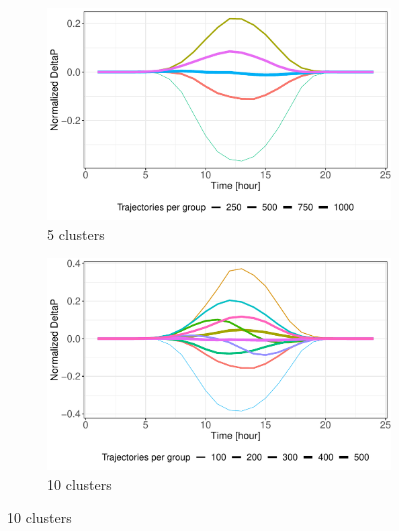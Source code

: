 \documentclass[12pt]{report}
\begin{document}
\begin{figure}[htbp] 
	\begin{subfigure}[b]{0.5\linewidth}
		\centering
		\includegraphics[width=0.9\linewidth]{Images/PV/Kmeans/Kmeans5Clusts.pdf} 
		\caption{5 clusters} 
	\end{subfigure}%
	\begin{subfigure}[b]{0.5\linewidth}
		\centering
		\includegraphics[width=0.9\linewidth]{Images/PV/Kmeans/Kmeans10Clusts.pdf} 
		\caption{10 clusters} 
	\end{subfigure}
	

\end{figure}
\end{document}
